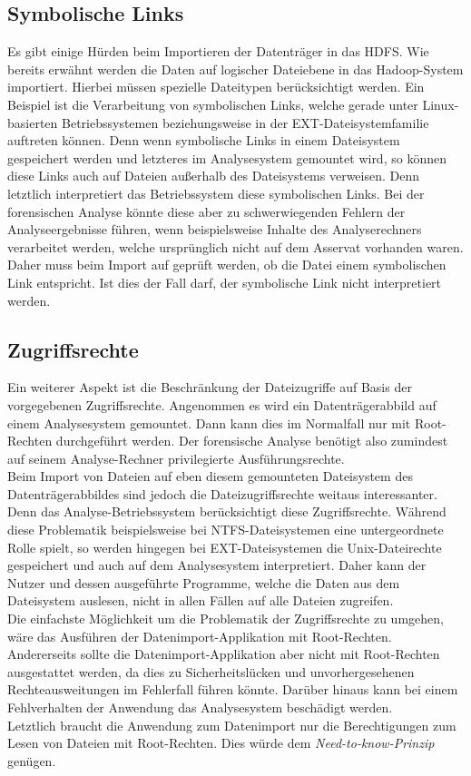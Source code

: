 \subsection{Symbolische Links}
Es gibt einige Hürden beim Importieren der Datenträger in das HDFS. Wie bereits erwähnt werden die Daten auf logischer Dateiebene in das Hadoop-System importiert. Hierbei müssen spezielle Dateitypen berücksichtigt werden. Ein Beispiel ist die Verarbeitung von symbolischen Links, welche gerade unter Linux-basierten Betriebssystemen beziehungsweise in der EXT-Dateisystemfamilie auftreten können. Denn wenn symbolische Links in einem Dateisystem gespeichert werden und letzteres im Analysesystem gemountet wird, so können diese Links auch auf Dateien außerhalb des Dateisystems verweisen. Denn letztlich interpretiert das Betriebssystem diese symbolischen Links. Bei der forensischen Analyse könnte diese aber zu schwerwiegenden Fehlern der Analyseergebnisse führen, wenn beispielsweise Inhalte des Analyserechners verarbeitet werden, welche ursprünglich nicht auf dem Asservat vorhanden waren. Daher muss beim Import auf geprüft werden, ob die Datei einem symbolischen Link entspricht. Ist dies der Fall darf, der symbolische Link nicht interpretiert werden. 

\subsection{Zugriffsrechte}
Ein weiterer Aspekt ist die Beschränkung der Dateizugriffe auf Basis der vorgegebenen Zugriffsrechte. Angenommen es wird ein Datenträgerabbild auf einem Analysesystem gemountet.
Dann kann dies im Normalfall nur mit Root-Rechten durchgeführt werden. 
Der forensische Analyse benötigt also zumindest auf seinem Analyse-Rechner 
privilegierte Ausführungsrechte.\\
Beim Import von Dateien auf eben diesem gemounteten Dateisystem des Datenträgerabbildes sind jedoch die Dateizugriffsrechte weitaus interessanter. Denn das Analyse-Betriebssystem berücksichtigt diese Zugriffsrechte. Während diese Problematik beispielsweise bei NTFS-Dateisystemen eine untergeordnete Rolle spielt, so werden hingegen bei EXT-Dateisystemen die Unix-Dateirechte gespeichert und auch auf dem Analysesystem interpretiert. 
Daher kann der Nutzer und dessen ausgeführte Programme, welche die Daten aus dem Dateisystem auslesen, nicht in allen Fällen auf alle Dateien zugreifen.\\

\noindent
Die einfachste Möglichkeit um die Problematik der Zugriffsrechte zu umgehen, wäre das Ausführen der Datenimport-Applikation mit Root-Rechten. Andererseits sollte die Datenimport-Applikation aber nicht mit Root-Rechten ausgestattet werden, da dies zu Sicherheitslücken und unvorhergesehenen Rechteausweitungen im Fehlerfall führen könnte. Darüber hinaus kann bei einem Fehlverhalten der Anwendung das Analysesystem beschädigt werden. \\
Letztlich braucht die Anwendung zum Datenimport nur die Berechtigungen zum Lesen von Dateien mit Root-Rechten. Dies würde dem \textit{Need-to-know-Prinzip} genügen.\\

